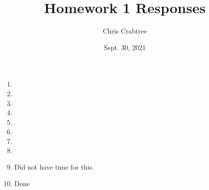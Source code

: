 \documentclass[12pt]{article}
\begin{document}
\title{Homework 1 Responses}
\author{Chris Crabtree}
\date{Sept. 30, 2021}

{
\let\clearpage\relax
\maketitle
}

\begin{enumerate}
    \item
        
    \item 
        
    \item
        
    \item
        
    \item
        
    \item
        
    \item
        
    \item
        
    \item Did not have time for this.
    \item Done

\end{enumerate}
\end{document}
